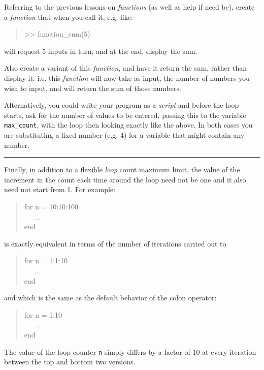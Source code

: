 \documentclass{tufte-book} %
\newenvironment{docspec}{\begin{quotation}\ttfamily\parskip0pt\parindent0pt\ignorespaces}{\end{quotation}}
\begin{document}
Referring to the previous lessons on \textit{functions} (as well as \textsf{help} if need be), create a \textit{function} that when you call it, e.g. like:
\begin{docspec}
>> function\_sum(5)
\end{docspec}
will request 5 inputs in turn, and at the end, display the sum.

Also create a variant of this \textit{function}, and have it return the sum, rather than display it. i.e. this \textit{function} will now take as input, the number of numbers you wish to input, and will return the sum of those numbers.

Alternatively, you could write your program as a \textit{script} and before the loop starts,  ask for the number of values to be entered, passing this to the variable \texttt{max\_count}, with the loop then looking exactly like the above. In both cases you are substituting a fixed number (e.g. 4) for a variable that might contain any number.

\vspace{1mm}
\noindent\rule{4cm}{0.5pt}
\vspace{2mm}

\noindent Finally, in addition to a flexible \textit{loop} count maximum limit, the value of the increment in the count each time around the loop need not be one and it also need not start from 1. For example:
\begin{docspec}
for n = 10:10:100
\\ \ \ \ ...
\\end
\end{docspec}
is exactly equivalent in terms of the number of iterations carried out to
\begin{docspec}
for n = 1:1:10
\\ \ \ \ ...
\\end
\end{docspec}
and which is the same as the default behavior of the colon operator:
\begin{docspec}
for n = 1:10
\\ \ \ \ ...
\\end
\end{docspec}
The value of  the loop counter \texttt{n} simply differs by a factor of 10 at every iteration between the top and bottom two versions.
\end{document}
